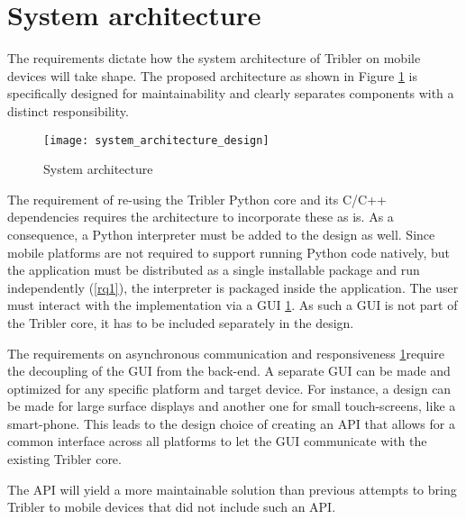 \section{System architecture}

The requirements dictate how the system architecture of Tribler on mobile devices will take shape.
The proposed architecture as shown in Figure \ref{fig:system_architecture_design} is specifically designed for maintainability and clearly separates components with a distinct responsibility.

\begin{figure}[H]
	\centering
	\texttt{[image: system\_architecture\_design]}
	\caption{System architecture}
	\label{fig:system_architecture_design}
\end{figure}

The requirement of re-using the Tribler Python core and its C/C++ dependencies requires the architecture to incorporate these as is.
As a consequence, a Python interpreter must be added to the design as well.
Since mobile platforms are not required to support running Python code natively, but the application must be distributed as a single installable package and run independently (\ref{rq1}), the interpreter is packaged inside the application.
The user must interact with the implementation via a GUI \ref{}.
As such a GUI is not part of the Tribler core, it has to be included separately in the design.

The requirements on asynchronous communication and responsiveness \ref{}require the decoupling of the GUI from the back-end. %
A separate GUI can be made and optimized for any specific platform and target device. %
For instance, a design can be made for large surface displays and another one for small touch-screens, like a smart-phone.
This leads to the design choice of creating an API that allows for a common interface across all platforms to let the GUI communicate with the existing Tribler core.

The API will yield a more maintainable solution than previous attempts to bring Tribler to mobile devices \cite{bsc1,2,3} that did not include such an API.



